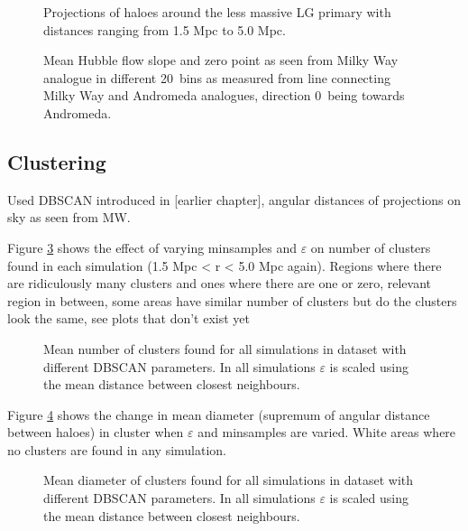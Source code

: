 \documentclass[english, oneside]{HYgradu}
\begin{document}
\begin{figure}
    \centering
    
    \caption{Projections of haloes around the less massive LG primary with distances ranging from 1.5 Mpc to 5.0 Mpc.}\label{fig:mollweide-anisotropy}
\end{figure}

\begin{figure}
    \centering
    
    \caption{Mean Hubble flow slope and zero point as seen from Milky Way analogue in different 20\textdegree\ bins as measured from line connecting Milky Way and Andromeda analogues, direction 0\textdegree\ being towards Andromeda.}\label{fig:directionalHF}
\end{figure}

\subsection{Clustering}
Used DBSCAN introduced in [earlier chapter], angular distances of projections on sky as seen from MW.

Figure \ref{fig:clusteringparameters} shows the effect of varying minsamples and $\varepsilon$ on number of clusters found in each simulation (1.5 Mpc < r < 5.0 Mpc again). Regions where there are ridiculously many clusters and ones where there are one or zero, relevant region in between, some areas have similar number of clusters but do the clusters look the same, see plots that don't exist yet

\begin{figure}
    \centering
    
    \caption{Mean number of clusters found for all simulations in dataset with different DBSCAN parameters. In all simulations $\varepsilon$ is scaled using the mean distance between closest neighbours.}\label{fig:clusteringparameters}
\end{figure}

\reversemarginpar
{}
Figure \ref{fig:clusterdiameter} shows the change in mean diameter (supremum of angular distance between haloes) in cluster when $\varepsilon$ and minsamples are varied. White areas where no clusters are found in any simulation.

\begin{figure}
    \centering
    
    \caption{Mean diameter of clusters found for all simulations in dataset with different DBSCAN parameters. In all simulations $\varepsilon$ is scaled using the mean distance between closest neighbours.}\label{fig:clusterdiameter}
\end{figure}
\end{document}
